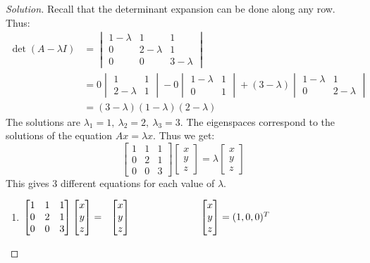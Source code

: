 \documentclass[../main.tex]{subfiles}
\begin{document}
\begin{proof}[Solution]
Recall that the determinant expansion can be done along any row. Thus:
%
\begin{align*}
    \det(A-\lambda I) &= \begin{vmatrix} 1-\lambda & 1 & 1 \\ 0 & 2-\lambda & 1 \\ 0 & 0 & 3-\lambda \end{vmatrix}\\
    &= 0\begin{vmatrix} 1 & 1 \\ 2-\lambda & 1 \end{vmatrix} - 0 \begin{vmatrix} 1-\lambda & 1 \\ 0 & 1 \end{vmatrix} + (3-\lambda)\begin{vmatrix} 1-\lambda & 1 \\ 0 & 2-\lambda\end{vmatrix}\\
    &= (3-\lambda)(1-\lambda)(2-\lambda)    
\end{align*}
The solutions are $\lambda_1 = 1,\ \lambda_2 = 2,\ \lambda_3 = 3$. The eigenspaces correspond to the solutions of the equation $Ax = \lambda x$. Thus we get: \begin{equation*}
    \begin{bmatrix} 1 & 1 & 1 \\ 0 & 2 & 1 \\ 0 & 0 & 3 \end{bmatrix}\begin{bmatrix} x \\ y \\ z \end{bmatrix} = \lambda \begin{bmatrix}x \\ y \\ z\end{bmatrix}    
\end{equation*}
This gives 3 different equations for each value of $\lambda$.
\begin{enumerate}
    \item $\begin{bmatrix} 1 & 1 & 1 \\ 0 & 2 & 1 \\ 0 & 0 & 3 \end{bmatrix}\begin{bmatrix} x \\ y \\ z \end{bmatrix} = \ \  \begin{bmatrix}x \\ y \\ z\end{bmatrix}\hspace{2.48 cm} \begin{bmatrix} x \\ y \\ z \end{bmatrix} = (1,0,0)^T$

\end{enumerate}
\end{proof}
\end{document}

